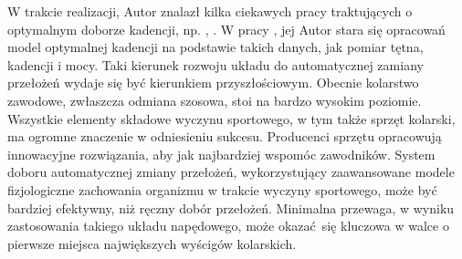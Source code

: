 W trakcie realizacji, Autor znalazł kilka ciekawych pracy traktujących o optymalnym doborze kadencji, np. \cite{phd}, \cite{iain}. W pracy \cite{phd}, jej Autor stara się opracowań model optymalnej kadencji na podstawie takich danych, jak pomiar tętna, kadencji i mocy. Taki kierunek rozwoju układu do automatycznej zamiany przełożeń wydaje się być kierunkiem przyszłościowym. Obecnie kolarstwo zawodowe, zwłaszcza odmiana szosowa, stoi na bardzo wysokim poziomie. Wszystkie elementy składowe wyczynu sportowego, w tym także sprzęt kolarski, ma ogromne znaczenie w odniesieniu sukcesu. Producenci sprzętu opracowują innowacyjne rozwiązania, aby jak najbardziej wspomóc zawodników. System doboru automatycznej zmiany przełożeń, wykorzystujący zaawansowane modele fizjologiczne zachowania organizmu w trakcie wyczyny sportowego, może być bardziej efektywny, niż ręczny dobór przełożeń. Minimalna przewaga, w wyniku zastosowania takiego układu napędowego, może okazać się kluczowa w walce o pierwsze miejsca największych wyścigów kolarskich.   

